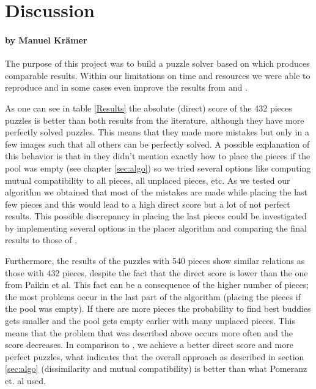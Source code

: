 \documentclass[11pt]{report}
\begin{document}
\chapter{Discussion}
\subsubsection*{by Manuel Krämer}

The purpose of this project was to build a puzzle solver based on \cite{Paikin2015} which produces comparable results. Within our limitations on time and resources we were able to reproduce and in some cases even improve the results from \cite{Paikin2015} and \cite{Pomeranz2011}.

As one can see in table \ref{Results} the absolute (direct) score of the 432 pieces puzzles is better than both results from the literature, although they have more perfectly solved puzzles. This means that they made more mistakes but only in a few images such that all others can be perfectly solved. A possible explanation of this behavior is that in \cite{Paikin2015} they didn't mention exactly how to place the pieces if the pool was empty (see chapter \ref{sec:algo}) so we tried several options like computing mutual compatibility to all pieces, all unplaced pieces, etc. As we tested our algorithm we obtained that most of the mistakes are made while placing the last few pieces and this would lead to a high direct score but a lot of not perfect results. This possible discrepancy in placing the last pieces could be investigated by implementing several options in the placer algorithm and comparing the final results to those of \cite{Paikin2015}.

Furthermore, the results of the puzzles with 540 pieces show similar relations as those with 432 pieces, despite the fact that the direct score is lower than the one from Paikin et al. This fact can be a consequence of the higher number of pieces; the most problems occur in the last part of the algorithm (placing the pieces if the pool was empty). If there are more pieces the probability to find best buddies gets smaller and the pool gets empty earlier with many unplaced pieces. This means that the problem that was described above occurs more often and the score decreases. In comparison to \cite{Pomeranz2011}, we achieve a better direct score and more perfect puzzles, what indicates that the overall approach as described in section \ref{sec:algo} (dissimilarity and mutual compatibility) is better than what Pomeranz et. al used.
\end{document}
